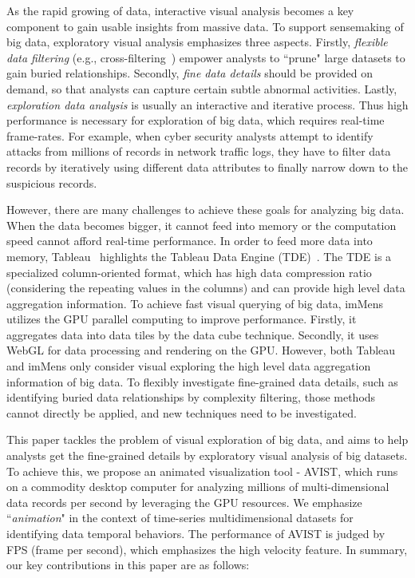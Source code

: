 
\maketitle


As the rapid growing of data, interactive visual analysis becomes a key component to gain usable insights from massive data. To support sensemaking of big data, exploratory visual analysis emphasizes three aspects. Firstly, \textsl{flexible data filtering} (e.g., cross-filtering~\cite{ weaver2008, weaver2010}) empower analysts to ``prune" large datasets to gain buried relationships. Secondly, \textsl{fine data details} should be provided on demand, so that analysts can capture certain subtle abnormal activities. Lastly, \textsl{exploration data analysis} is usually an interactive and iterative process. Thus high performance is necessary for exploration of big data, which requires real-time frame-rates. For example, when cyber security analysts attempt to identify attacks from millions of records in network traffic logs, they have to filter data records by iteratively using different data attributes to finally narrow down to the suspicious records.  

However, there are many challenges to achieve these goals for analyzing big data.
 When the data becomes bigger, it cannot feed into memory or the computation speed cannot afford real-time performance. In order to feed more data into memory, Tableau~\cite{tab} highlights the Tableau Data Engine (TDE)~\cite{Wesley}. The TDE is a specialized column-oriented format, which has high data compression ratio (considering the repeating values in the columns) and can provide high level data aggregation information. To achieve fast visual querying of big data, imMens~\cite{2013-immens} utilizes the GPU parallel computing to improve performance. Firstly, it aggregates data into data tiles by the data cube technique. Secondly, it uses WebGL for data processing and rendering on the GPU. However, both Tableau and imMens only consider visual exploring the high level data aggregation information of big data. To flexibly investigate fine-grained data details, such as identifying buried data relationships by complexity filtering, those methods cannot directly be applied, and new techniques need to be investigated.   

This paper tackles the problem of  visual exploration of big data,  and aims to help analysts  get the fine-grained details by exploratory visual analysis of big datasets. To achieve this, we propose an animated visualization tool - AVIST, which runs on a  commodity desktop computer for analyzing millions of multi-dimensional data records per second by leveraging the GPU resources. We emphasize ``\textit{animation}" in the context of time-series multidimensional datasets for identifying data temporal behaviors. The performance of AVIST is judged by FPS (frame per second), which emphasizes the high velocity feature. In summary, our key contributions in this paper are as follows:

